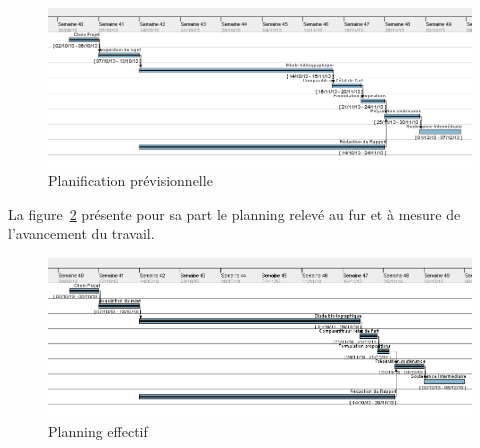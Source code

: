 \documentclass[11pt, french,screen]{report-rd-info}
\begin{document}
\begin{figure}
	\centering
		\includegraphics[width=1\textwidth]{Gantts/p1_previsionnel}
	\caption{Planification prévisionnelle}
	\label{fig:PlanningPrevisionnel}
\end{figure}
La figure~\ref{fig:PlanningEffectif} présente pour sa part le planning relevé au fur et à mesure de l'avancement du travail.
\begin{figure}
	\centering
		\includegraphics[width=1\textwidth]{Gantts/p1_effectif}
	\caption{Planning effectif}
	\label{fig:PlanningEffectif}
\end{figure}
\end{document}
